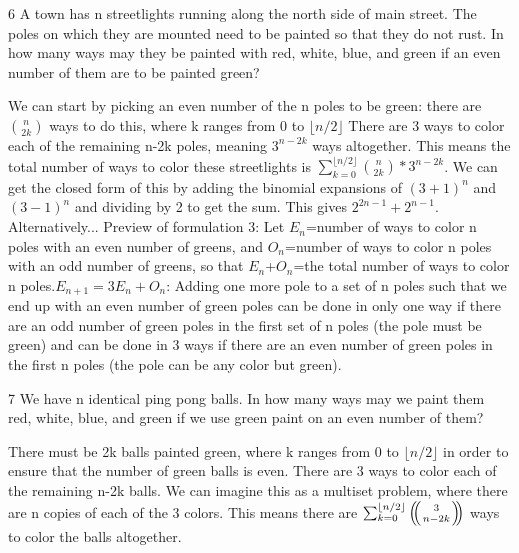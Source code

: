 
\begin{problem} 6 {A town has n streetlights running along the north side of main street. The poles on which they are mounted need to be painted so that they do not rust. In how many ways may they be painted with red, white, blue, and green if an even number of them are to be painted green?}
\end{problem}
    We can start by picking an even number of the n poles to be green: there are $\binom{n}{2k}$ ways to do this, where k ranges from 0 to ${\lfloor {n/2} \rfloor}$ There are 3 ways to color each of the remaining n-2k poles, meaning $3^{n-2k}$ ways altogether. This means the total number of ways to color these streetlights is $\sum_{k=0}^{\lfloor{n/2} \rfloor} {\binom{n}{2k} * 3^{n-2k}}$. We can get the closed form of this by adding the binomial expansions of $(3+1)^n$ and $(3-1)^n$ and dividing by 2 to get the sum. This gives $2^{2n-1}+2^{n-1}$. 
\newline
Alternatively...
\newline
Preview of formulation 3:
\newline
Let $E_n$=number of ways to color n poles with an even number of greens, and $O_n$=number of ways to color n poles with an odd number of greens, so that $E_n$+$O_n$=the total number of ways to color n poles.$E_{n+1}=3E_n+O_n$: Adding one more pole to a set of n poles such that we end up with an even number of green poles can be done in only one way if there are an odd number of green poles in the first set of n poles (the pole must be green) and can be done in 3 ways if there are an even number of green poles in the first n poles (the pole can be any color but green). 


\begin{problem} 7 {We have n identical ping pong balls. In how many ways may we paint them red, white, blue, and green if we use green paint on an even number of them?}
\end{problem}
There must be 2k balls painted green, where k ranges from 0 to ${\lfloor n/2 \rfloor}$ in order to ensure that the number of green balls is even. There are 3 ways to color each of the remaining n-2k balls. We can imagine this as a multiset problem, where there are n copies of each of the 3 colors. This means there are \(\sum_{k=0}^{\lfloor n/2 \rfloor} \multiset{3}{n-2k}\) ways to color the balls altogether. 

